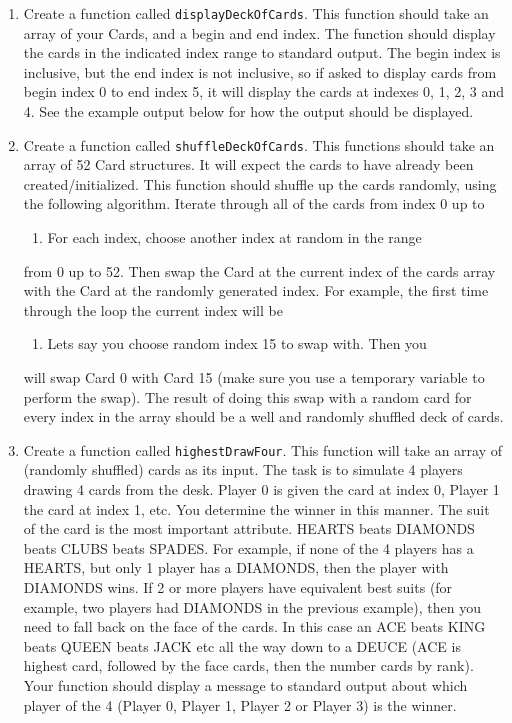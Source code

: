 \documentclass[11pt]{article}
\begin{document}
\begin{enumerate}
\item Create a function called \verb~displayDeckOfCards~.  This function
should take an array of your Cards, and a begin and end index.  The
function should display the cards in the indicated index range to
standard output.  The begin index is inclusive, but the end index
is not inclusive, so if asked to display cards from begin index 0
to end index 5, it will display the cards at indexes 0, 1, 2, 3
and 4.  See the example output below for how the output should be
displayed.

\item Create a function called \verb~shuffleDeckOfCards~.  This functions
should take an array of 52 Card structures.  It will expect
the cards to have already been created/initialized.  This function
should shuffle up the cards randomly, using the following
algorithm.  Iterate through all of the cards from index 0 up to
\begin{enumerate}
\item For each index, choose another index at random in the range
\end{enumerate}
from 0 up to 52.  Then swap the Card at the current index of the
cards array with the Card at the randomly generated index.  For
example, the first time through the loop the current index will be
\begin{enumerate}
\item Lets say you choose random index 15 to swap with.  Then you
\end{enumerate}
will swap Card 0 with Card 15 (make sure you use a temporary
variable to perform the swap).  The result of doing this swap with
a random card for every index in the array should be a well and
randomly shuffled deck of cards.

\item Create a function called \verb~highestDrawFour~.  This function will
take an array of (randomly shuffled) cards as its input.  The
task is to simulate 4 players drawing 4 cards from the desk.  
Player 0 is given the card at index 0, Player 1 the card at
index 1, etc.  You determine the winner in this manner.  The
suit of the card is the most important attribute.  
HEARTS beats DIAMONDS beats CLUBS beats SPADES.  For example,
if none of the 4 players has a HEARTS, but only 1 player has
a DIAMONDS, then the player with DIAMONDS wins.  If 2 or more
players have equivalent best suits (for example, two players had
DIAMONDS in the previous example), then you need to fall back
on the face of the cards.  In this case an ACE beats KING beats
QUEEN beats JACK etc all the way down to a DEUCE (ACE is highest
card, followed by the face cards, then the number cards by rank).
Your function should display a message to standard output about
which player of the 4 (Player 0, Player 1, Player 2 or Player 3)
is the winner.


\end{enumerate}
\end{document}
